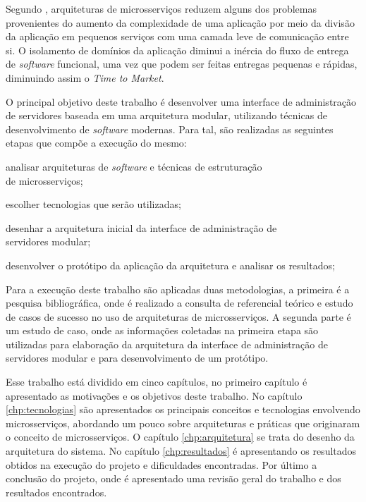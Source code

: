 Segundo , arquiteturas de microsserviços reduzem
alguns dos problemas provenientes do aumento da complexidade de uma aplicação
por meio da divisão da aplicação em pequenos serviços com uma camada leve
de comunicação entre si. O isolamento de domínios da aplicação diminui a
inércia do fluxo de entrega de \emph{software} funcional, uma vez que podem ser
feitas entregas pequenas e rápidas, diminuindo assim o \emph{Time to Market}.

O principal objetivo deste trabalho é desenvolver uma interface de
administração de servidores baseada em uma arquitetura modular, utilizando
técnicas de desenvolvimento de \emph{software} modernas. Para tal, são
realizadas as seguintes etapas que compõe a execução do mesmo:

\begin{alineas}
  \item analisar arquiteturas de \emph{software} e técnicas de estruturação \\
    de microsserviços;
  \item escolher tecnologias que serão utilizadas;
  \item desenhar a arquitetura inicial da interface de administração de \\
    servidores modular;
  \item desenvolver o protótipo da aplicação da arquitetura e analisar os
    resultados;
\end{alineas}

Para a execução deste trabalho são aplicadas duas metodologias, a primeira
é a pesquisa bibliográfica, onde é realizado a consulta de referencial
teórico e estudo de casos de sucesso no uso de arquiteturas de microsserviços.
A segunda parte é um estudo de caso, onde as informações coletadas
na primeira etapa são utilizadas para elaboração da arquitetura da interface
de administração de servidores modular e para desenvolvimento de um protótipo.

Esse trabalho está dividido em cinco capítulos, no primeiro capítulo é
apresentado as motivações e os objetivos deste trabalho. No capítulo
\ref{chp:tecnologias} são apresentados os principais conceitos e tecnologias
envolvendo microsserviços, abordando um pouco sobre arquiteturas
e práticas que originaram o conceito de microsserviços. O capítulo
\ref{chp:arquitetura} se trata do desenho da arquitetura do sistema. No
capítulo \ref{chp:resultados} é apresentando os resultados obtidos na execução
do projeto e dificuldades encontradas. Por último a conclusão do projeto,
onde é apresentado uma revisão geral do trabalho e dos resultados encontrados.

